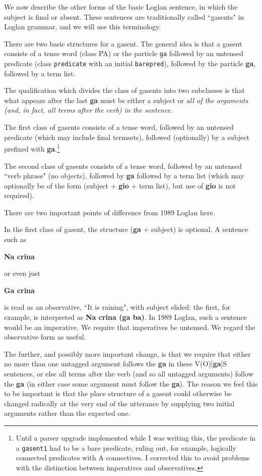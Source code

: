 \documentclass[12pt]{book}
\begin{document}
{We now describe the other forms of the basic Loglan sentence, in which the subject is final or absent.  These sentences are traditionally called
``gasents" in Loglan grammar, and we will use this terminology.

There are two basic structures for a gasent.  The general idea is that a gasent consists of a tense word (class PA) or the particle {\tt ga} followed by an untensed predicate  (class {\tt predicate} with an initial {\tt barepred}), followed by the particle {\bf ga}, followed by a term list.  

The qualification which divides the class of gasents into two subclasses is that what appears after the last {\bf ga} must be either a subject or
{\em all of the arguments  (and, in fact, all terms after the verb) in the sentence\/}. 

The first class of gasents consists of a tense word, followed by an untensed predicate (which may include final termsets), followed (optionally) by a subject prefixed with {\bf ga}.\footnote{Until a parser upgrade implemented while I was writing this, the predicate in a {\tt gasent1} had to be a bare predicate, ruling out, for example, logically connected predicates with A connectives.   I corrected this to avoid problems with the distinction between imperatives and observatives.}

The second class of gasents consists of a tense word, followed by an untensed ``verb phrase" (no objects), followed by {\bf ga} followed by a term list
(which may optionally be of the form (subject + {\bf gio} + term list), but use of {\bf gio} is not required).

There are two important points of difference from 1989 Loglan here.

In the first class of gasent, the structure ({\bf ga} + subject) is optional.  A sentence such as

{\bf Na crina}

or even just

{\bf Ga crina}

is read as an observative, ``It is raining", with subject elided:  the first, for example,  is interpreted as {\bf Na crina (ga ba)}.  In 1989 Loglan, such a sentence would be an imperative.  We require that
imperatives be untensed.  We regard the observative form as useful.

The further, and possibly more important change, is that we require that either no more than one untagged argument  follows the {\bf ga} in
these V(O)[{\bf ga}]S sentences, or else all terms after the verb (and so all untagged arguments) follow the {\bf ga} (in either case some argument must follow the {\bf ga}).  The reason we feel this to be important is that the place structure of a gasent could otherwise be changed radically at the very end of the utterance by supplying two initial arguments rather than the expected one.

}
\end{document}
